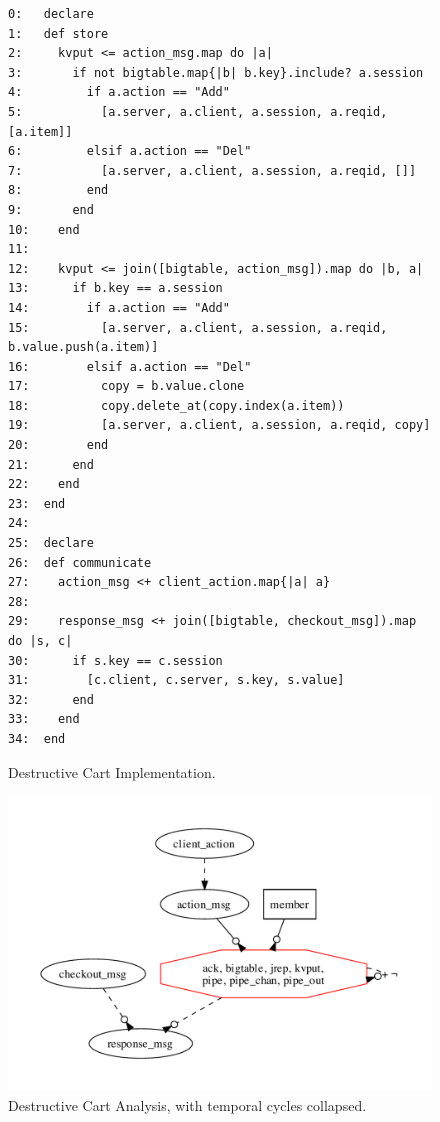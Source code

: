 \begin{figure}[t]
\begin{scriptsize}
\begin{verbatim}
0:   declare
1:   def store
2:     kvput <= action_msg.map do |a|
3:       if not bigtable.map{|b| b.key}.include? a.session
4:         if a.action == "Add"
5:           [a.server, a.client, a.session, a.reqid, [a.item]]
6:         elsif a.action == "Del"
7:           [a.server, a.client, a.session, a.reqid, []]
8:         end
9:       end
10:    end  
11:
12:    kvput <= join([bigtable, action_msg]).map do |b, a|
13:      if b.key == a.session
14:        if a.action == "Add"
15:          [a.server, a.client, a.session, a.reqid, b.value.push(a.item)]
16:        elsif a.action == "Del"
17:          copy = b.value.clone
18:          copy.delete_at(copy.index(a.item))
19:          [a.server, a.client, a.session, a.reqid, copy]
20:        end
21:      end
22:    end
23:  end
24:
25:  declare
26:  def communicate
27:    action_msg <+ client_action.map{|a| a}
28:
29:    response_msg <+ join([bigtable, checkout_msg]).map do |s, c|
30:      if s.key == c.session
31:        [c.client, c.server, s.key, s.value]
32:      end
33:    end
34:  end
\end{verbatim}
\vspace{-10pt}
\caption{Destructive Cart Implementation.}
\label{fig:pdg-destructive}
\vspace{-2pt}
\end{scriptsize}
\end{figure}

\begin{figure}[t]
\centering
\includegraphics[width=0.9\linewidth]{fig/destructive.pdf}
\vspace{-10pt}
\caption{Destructive Cart Analysis, with temporal cycles collapsed.}
\label{fig:pdg-destructive-analysis}
\vspace{-2pt}
\end{figure}


